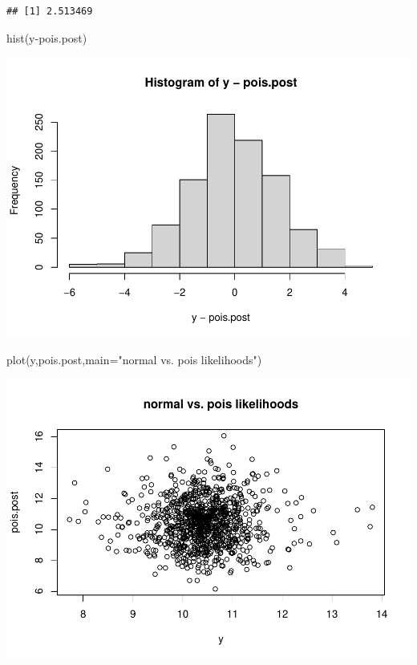 \documentclass[
]{book}
\newenvironment{Shaded}{\begin{snugshade}}{\end{snugshade}}
\newcommand{\AttributeTok}[1]{\textcolor[rgb]{0.77,0.63,0.00}{#1}}
\newcommand{\FunctionTok}[1]{\textcolor[rgb]{0.00,0.00,0.00}{#1}}
\newcommand{\NormalTok}[1]{#1}
\newcommand{\SpecialCharTok}[1]{\textcolor[rgb]{0.00,0.00,0.00}{#1}}
\newcommand{\StringTok}[1]{\textcolor[rgb]{0.31,0.60,0.02}{#1}}
\theoremstyle{definition}
\theoremstyle{definition}
\theoremstyle{definition}
\theoremstyle{definition}
\theoremstyle{remark}
\begin{document}
\begin{verbatim}
## [1] 2.513469
\end{verbatim}

\begin{Shaded}
\begin{Highlighting}[]
 \FunctionTok{hist}\NormalTok{(y}\SpecialCharTok{{-}}\NormalTok{pois.post)}
\end{Highlighting}
\end{Shaded}

\includegraphics{_main_files/figure-latex/unnamed-chunk-41-1.pdf}

\begin{Shaded}
\begin{Highlighting}[]
 \FunctionTok{plot}\NormalTok{(y,pois.post,}\AttributeTok{main=}\StringTok{"normal vs. pois likelihoods"}\NormalTok{)}
\end{Highlighting}
\end{Shaded}

\includegraphics{_main_files/figure-latex/unnamed-chunk-41-2.pdf}
\end{document}
